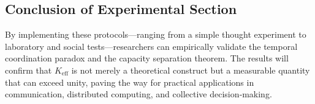 \documentclass[12pt]{article}
\begin{document}
	\subsection{Conclusion of Experimental Section}
	
	By implementing these protocols—ranging from a simple thought experiment to laboratory and social tests—researchers can empirically validate the temporal coordination paradox and the capacity separation theorem. The results will confirm that \(K_{\mathrm{eff}}\) is not merely a theoretical construct but a measurable quantity that can exceed unity, paving the way for practical applications in communication, distributed computing, and collective decision‑making.
	
\end{document}
